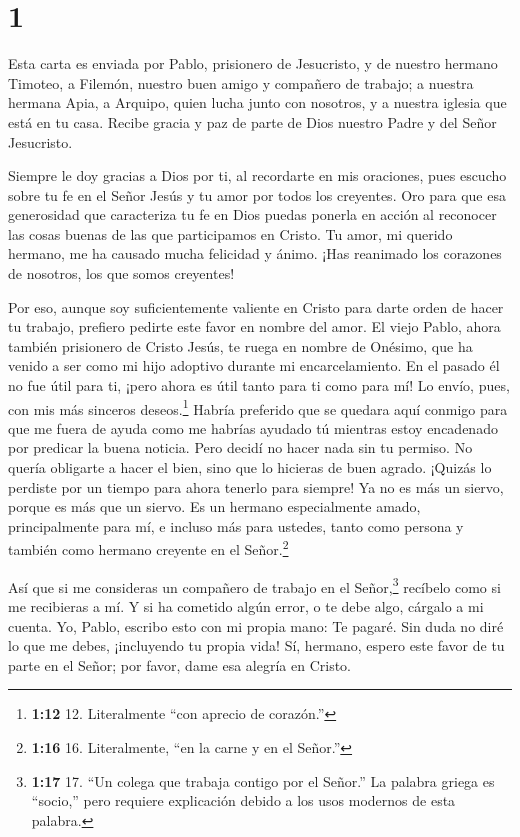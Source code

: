 \hypertarget{section}{%
\section{1}\label{section}}

 Esta carta es enviada por Pablo, prisionero de Jesucristo,
y de nuestro hermano Timoteo, a Filemón, nuestro buen amigo y compañero
de trabajo;  a nuestra hermana Apia, a Arquipo, quien lucha
junto con nosotros, y a nuestra iglesia que está en tu casa.
 Recibe gracia y paz de parte de Dios nuestro Padre y del
Señor Jesucristo.

 Siempre le doy gracias a Dios por ti, al recordarte en mis
oraciones,  pues escucho sobre tu fe en el Señor Jesús y tu
amor por todos los creyentes.  Oro para que esa generosidad
que caracteriza tu fe en Dios puedas ponerla en acción al reconocer las
cosas buenas de las que participamos en Cristo.  Tu amor, mi
querido hermano, me ha causado mucha felicidad y ánimo. ¡Has reanimado
los corazones de nosotros, los que somos creyentes!

 Por eso, aunque soy suficientemente valiente en Cristo para
darte orden de hacer tu trabajo,  prefiero pedirte este
favor en nombre del amor. El viejo Pablo, ahora también prisionero de
Cristo Jesús,  te ruega en nombre de Onésimo, que ha venido
a ser como mi hijo adoptivo durante mi encarcelamiento.  En
el pasado él no fue útil para ti, ¡pero ahora es útil tanto para ti como
para mí!  Lo envío, pues, con mis más sinceros
deseos.\footnote{\textbf{1:12} 12. Literalmente ``con aprecio de
  corazón.''}  Habría preferido que se quedara aquí conmigo
para que me fuera de ayuda como me habrías ayudado tú mientras estoy
encadenado por predicar la buena noticia.  Pero decidí no
hacer nada sin tu permiso. No quería obligarte a hacer el bien, sino que
lo hicieras de buen agrado.  ¡Quizás lo perdiste por un
tiempo para ahora tenerlo para siempre!  Ya no es más un
siervo, porque es más que un siervo. Es un hermano especialmente amado,
principalmente para mí, e incluso más para ustedes, tanto como persona y
también como hermano creyente en el Señor.\footnote{\textbf{1:16} 16.
  Literalmente, ``en la carne y en el Señor.''}

 Así que si me consideras un compañero de trabajo en el
Señor,\footnote{\textbf{1:17} 17. ``Un colega que trabaja contigo por el
  Señor.'' La palabra griega es ``socio,'' pero requiere explicación
  debido a los usos modernos de esta palabra.} recíbelo como si me
recibieras a mí.  Y si ha cometido algún error, o te debe
algo, cárgalo a mi cuenta.  Yo, Pablo, escribo esto con mi
propia mano: Te pagaré. Sin duda no diré lo que me debes, ¡incluyendo tu
propia vida!  Sí, hermano, espero este favor de tu parte en
el Señor; por favor, dame esa alegría en Cristo.

